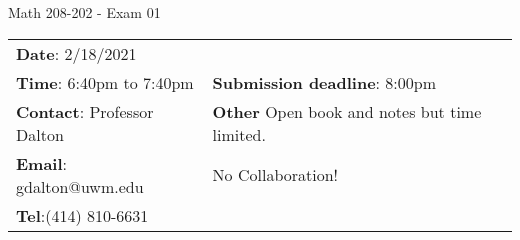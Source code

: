 \documentclass[12pt,letterpaper]{article}
\author{Gary Dalton <gdalton@uwm.edu>}
\begin{document}
	
\begin{center} \LARGE Math 208-202 - Exam 01\end{center}%
\smallskip

\begin{center} \begin{tabular}{l l}
		\textbf{Date}: 2/18/2021 \\
		\textbf{Time}: 6:40pm to 7:40pm &
		\textbf{Submission deadline}: 8:00pm\\
		\textbf{Contact}: Professor Dalton
		& \textbf{Other} Open book and notes but time limited. \\
		\textbf{Email}: gdalton@uwm.edu 
		& \qquad No Collaboration! \\
		\textbf{Tel}:(414) 810-6631
\end{tabular} \end{center}%
\end{document}

